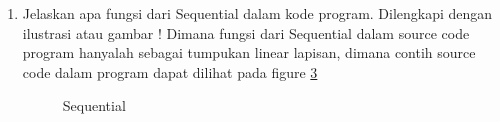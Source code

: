 \begin{enumerate}
	\begin{figure}[!htbp]
		\caption{np.unique}
		\label{YNC6-6}
	\end{figure}	

	\subitem Fungsi dari to\_categorical yaitu untuk mengubah vektor ke dalam matriks class biner. Contoh source code to\_categorical dapat dilihat pada figure \ref{YNC6-7}

	\begin{figure}[!htbp]
		\caption{categorical}
		\label{YNC6-7}
	\end{figure}	

\item Jelaskan apa fungsi dari Sequential dalam kode program. Dilengkapi dengan ilustrasi atau gambar !
	\subitem Dimana fungsi dari Sequential dalam source code program hanyalah sebagai tumpukan linear lapisan, dimana contih source code dalam program dapat dilihat pada figure \ref{YNC6-8}

	\begin{figure}[!htbp]
		\caption{Sequential}
		\label{YNC6-8}
	\end{figure}

\end{enumerate}

